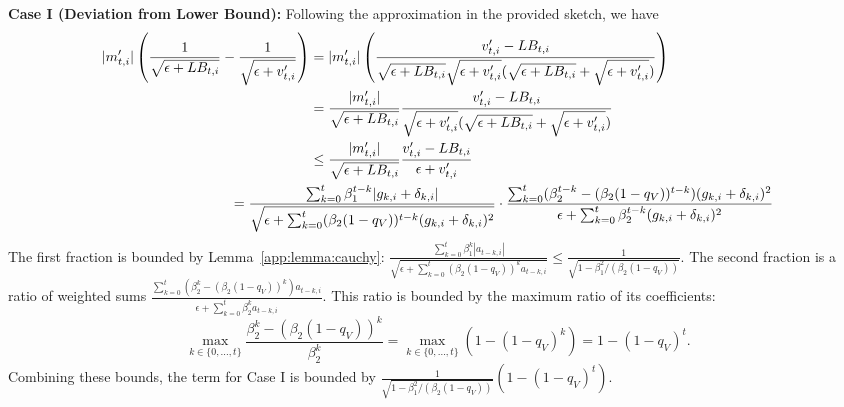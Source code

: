\documentclass[11pt, letterpaper]{article}
\begin{document}
\textbf{Case I (Deviation from Lower Bound):} Following the approximation in the provided sketch, we have
\begin{align}
    \nonumber
    |m'_{t,i}| \left( \frac{1}{\sqrt{\epsilon+LB_{t,i}}} - \frac{1}{\sqrt{\epsilon+v'_{t,i}}} \right) 
    \nonumber
    &=|m'_{t,i}|\left( \frac{v'_{t,i}-LB_{t,i}}{\sqrt{\epsilon+LB_{t,i}}\sqrt{\epsilon+v'_{t,i}}(\sqrt{\epsilon+LB_{t,i}}+\sqrt{\epsilon+v'_{t,i}})}        \right)\\
    \nonumber
    &= \frac{|m'_{t,i}|}{\sqrt{\epsilon+LB_{t,i}}} \frac{v'_{t,i} - LB_{t,i}}{\sqrt{\epsilon+v'_{t,i}}(\sqrt{\epsilon+LB_{t,i}}+\sqrt{\epsilon+v'_{t,i}})} \\
    \nonumber
    &\le \frac{|m'_{t,i}|}{\sqrt{\epsilon+LB_{t,i}}} \frac{v'_{t,i} - LB_{t,i}}{\epsilon+v'_{t,i}}\\
    &\hspace*{-2cm} =  \frac{\sum_{k=0}^{t} \beta_1^{t-k}|g_{k,i}+\delta_{k,i}|}{\sqrt{\epsilon+\sum_{k=0}^{t} (\beta_2(1-q_V))^{t-k} (g_{k,i}+\delta_{k,i})^2}} \cdot \frac{\sum_{k=0}^{t} (\beta_2^{t-k} - (\beta_2(1-q_V))^{t-k}) (g_{k,i}+\delta_{k,i})^2}{\epsilon+\sum_{k=0}^{t} \beta_2^{t-k} (g_{k,i}+\delta_{k,i})^2}
\end{align}
The first fraction is bounded by Lemma~\ref{app:lemma:cauchy}: $\frac{\sum_{k=0}^{t}\beta_1^k |a_{t-k,i}|}{\sqrt{\epsilon+\sum_{k=0}^{t}(\beta_2(1-q_V))^k a_{t-k,i}}} \le \frac{1}{\sqrt{1-\beta_1^2/(\beta_2(1-q_V))}}$.
The second fraction is a ratio of weighted sums $\frac{\sum_{k=0}^{t} (\beta_2^k - (\beta_2(1-q_V))^k) a_{t-k,i}}{\epsilon+\sum_{k=0}^{t} \beta_2^k a_{t-k,i}}$. This ratio is bounded by the maximum ratio of its coefficients:
\begin{equation*}
    \max_{k \in \{0,\dots,t\}} \frac{\beta_2^k - (\beta_2(1-q_V))^k}{\beta_2^k} = \max_{k \in \{0,\dots,t\}} (1 - (1-q_V)^k) = 1-(1-q_V)^{t}.
\end{equation*}
Combining these bounds, the term for Case I is bounded by $\frac{1}{\sqrt{1-\beta_1^2/(\beta_2(1-q_V))}}(1-(1-q_V)^t)$.
\end{document}
